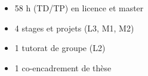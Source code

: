 
\begin{itemize}
	\item 58 h (TD/TP) en licence et master
\end{itemize}

\begin{itemize}
	\item 4 stages et projets (L3, M1, M2)
	\item 1 tutorat de groupe (L2)
	\item 1 co-encadrement de thèse
\end{itemize}










%
%
%





